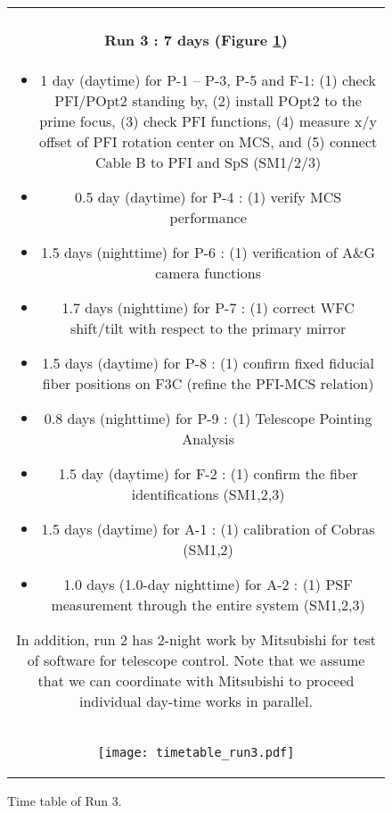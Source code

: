 \begin{figure}[!ht]
\begin{center}
\begin{tabular}{c}
\begin{minipage}{0.95\hsize}
\paragraph{Run 3 : 7 days  (Figure \ref{fig:run3})}
	\begin{itemize}
	\item 1 day (daytime) for P-1 -- P-3, P-5  and F-1:
	(1) check PFI/POpt2 standing by,
	(2) install POpt2 to the prime focus,
	(3) check PFI functions,
	(4) measure x/y offset of PFI rotation center on MCS, and
	(5) connect Cable B to PFI and SpS (SM1/2/3)
	\item 0.5 day (daytime) for P-4 :
	(1) verify  MCS performance
	\item 1.5 days (nighttime) for P-6 :
	(1) verification of A\&G camera functions 
	\item 1.7 days (nighttime) for P-7 :
	(1) correct WFC shift/tilt with respect to the primary mirror
	\item 1.5 days (daytime) for P-8 :  
	(1) confirm fixed fiducial fiber positions on F3C (refine the PFI-MCS relation)
	\item 0.8 days (nighttime) for P-9 :
	(1) Telescope Pointing Analysis
	\item 1.5 day (daytime) for F-2 :  
	(1) confirm  the fiber identifications (SM1,2,3)
	\item 1.5 days (daytime) for A-1 : 
	(1) calibration of Cobras (SM1,2)
	\item 1.0 days (1.0-day nighttime) for A-2 : 
	(1) PSF measurement through the entire system (SM1,2,3)	
\end{itemize}
In addition, run 2 has 2-night work by Mitsubishi for test of software for telescope control.
Note that we assume that we can coordinate with Mitsubishi to proceed individual day-time works in parallel.
\end{minipage} \\
\begin{minipage}{0.8\hsize}
	\begin{center}
	\vspace*{5mm}
	\texttt{[image: timetable\_run3.pdf]}
	\end{center}
	\vspace*{-5mm}
	\caption{Time table of Run 3.}
	\label{fig:run3}
\end{minipage}
\end{tabular}
\end{center}
\end{figure}

